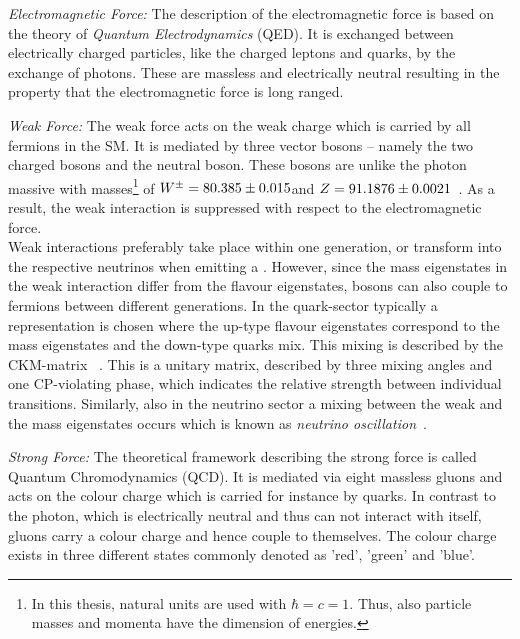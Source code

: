 \begin{description}
 \begin{description}
  \item \textit{Electromagnetic Force:} The description of the electromagnetic force is based on the theory of \textit{Quantum Electrodynamics} (QED). It is exchanged between electrically charged particles, like the charged leptons and quarks, by the exchange of photons. These are massless and electrically neutral resulting in the property that the electromagnetic force is long ranged.
  \item \textit{Weak Force:} The weak force acts on the weak charge which is carried by all fermions in the SM. It is mediated by three vector bosons -- namely the two charged \Wpm bosons and the neutral \Z boson. These bosons are unlike the photon massive with masses\footnote{In this thesis, natural units are used with $\hbar = c =1$. Thus, also particle masses and momenta have the dimension of energies.} of $W^{\pm} = 80.385 \pm 0.015$\gev and $Z = 91.1876 \pm 0.0021$\gev~\cite{bib:PDG:2012}. As a result, the weak interaction is suppressed with respect to the electromagnetic force. \\
Weak interactions preferably take place within one generation, \eg \lel or \lmu transform into the respective neutrinos when emitting a \Wm. However, since the mass eigenstates in the weak interaction differ from the flavour eigenstates, \Wpm bosons can also couple to fermions between different generations. In the quark-sector typically a representation is chosen where the up-type flavour eigenstates correspond to the mass eigenstates and the down-type quarks mix. This mixing is described by the CKM-matrix ~\cite{PhysRevLett.10.531, PTP.49.652}. This is a unitary matrix, described by three mixing angles and one CP-violating phase, which indicates the relative strength between individual transitions. Similarly, also in the neutrino sector a mixing between the weak and the mass eigenstates occurs which is known as \textit{neutrino oscillation}~\cite{Maki:1962mu, Pontecorvo:1967fh, Fukuda:1998mi}.
  \item \textit{Strong Force:} The theoretical framework describing the strong force is called Quantum Chromodynamics (QCD). It is mediated via eight massless gluons and acts on the colour charge which is carried for instance by quarks. In contrast to the photon, which is electrically neutral and thus can not interact with itself, gluons carry a colour charge and hence couple to themselves. The colour charge exists in three different states commonly denoted as 'red', 'green' and 'blue'. \\

\end{description}
\end{description}
